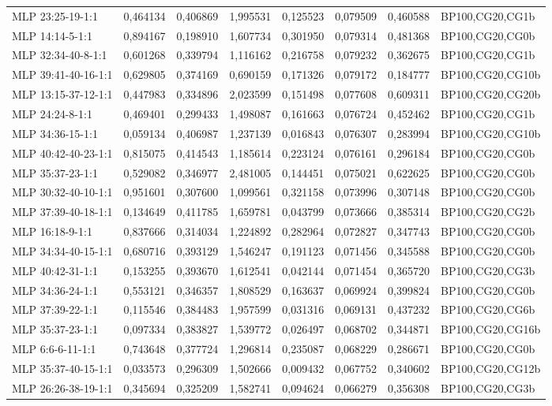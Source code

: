 \documentclass[10pt,oneside]{memoir}
\begin{document}
\begin{table}[htbp]
\begin{minipage}{\linewidth}
\begin{tabulary}{\linewidth}{@{}l@{}l@{}l@{}l@{}l@{}l@{}l@{}l@{}}
MLP 23:25-19-1:1&0,464134&0,406869&1,995531&0,125523&0,079509&0,460588&BP100,CG20,CG1b \\
MLP 14:14-5-1:1&0,894167&0,198910&1,607734&0,301950&0,079314&0,481368&BP100,CG20,CG0b \\
MLP 32:34-40-8-1:1&0,601268&0,339794&1,116162&0,216758&0,079232&0,362675&BP100,CG20,CG1b \\
MLP 39:41-40-16-1:1&0,629805&0,374169&0,690159&0,171326&0,079172&0,184777&BP100,CG20,CG10b \\
MLP 13:15-37-12-1:1&0,447983&0,334896&2,023599&0,151498&0,077608&0,609311&BP100,CG20,CG20b \\
MLP 24:24-8-1:1&0,469401&0,299433&1,498087&0,161663&0,076724&0,452462&BP100,CG20,CG1b \\
MLP 34:36-15-1:1&0,059134&0,406987&1,237139&0,016843&0,076307&0,283994&BP100,CG20,CG10b \\
MLP 40:42-40-23-1:1&0,815075&0,414543&1,185614&0,223124&0,076161&0,296184&BP100,CG20,CG0b \\
MLP 35:37-23-1:1&0,529082&0,346977&2,481005&0,144451&0,075021&0,622625&BP100,CG20,CG0b \\
MLP 30:32-40-10-1:1&0,951601&0,307600&1,099561&0,321158&0,073996&0,307148&BP100,CG20,CG0b \\
MLP 37:39-40-18-1:1&0,134649&0,411785&1,659781&0,043799&0,073666&0,385314&BP100,CG20,CG2b \\
MLP 16:18-9-1:1&0,837666&0,314034&1,224892&0,282964&0,072827&0,347743&BP100,CG20,CG0b \\
MLP 34:34-40-15-1:1&0,680716&0,393129&1,546247&0,191123&0,071456&0,345588&BP100,CG20,CG0b \\
MLP 40:42-31-1:1&0,153255&0,393670&1,612541&0,042144&0,071454&0,365720&BP100,CG20,CG3b \\
MLP 34:36-24-1:1&0,553121&0,346357&1,808529&0,163637&0,069924&0,399824&BP100,CG20,CG0b \\
MLP 37:39-22-1:1&0,115546&0,384483&1,957599&0,031316&0,069131&0,437232&BP100,CG20,CG6b \\
MLP 35:37-23-1:1&0,097334&0,383827&1,539772&0,026497&0,068702&0,344871&BP100,CG20,CG16b \\
MLP 6:6-6-11-1:1&0,743648&0,377724&1,296814&0,235087&0,068229&0,286671&BP100,CG20,CG0b \\
MLP 35:37-40-15-1:1&0,033573&0,296309&1,502666&0,009432&0,067752&0,340602&BP100,CG20,CG12b \\
MLP 26:26-38-19-1:1&0,345694&0,325209&1,582741&0,094624&0,066279&0,356308&BP100,CG20,CG3b \\

\end{tabulary}
\end{minipage}
\end{table}
\end{document}
